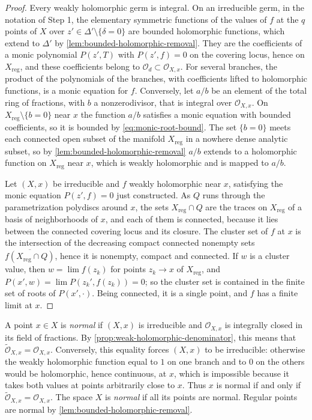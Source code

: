 \begin{proof}
Every weakly holomorphic germ is integral. On an irreducible germ, in the notation of Step 1, the elementary symmetric functions of the values of $f$ at the $q$ points of $X$ over $z'\in\Delta'\setminus\{\delta=0\}$ are bounded holomorphic functions, which extend to $\Delta'$ by \cref{lem:bounded-holomorphic-removal}. They are the coefficients of a monic polynomial $P(z',T)$ with $P(z',f)=0$ on the covering locus, hence on $X_{\mathrm{reg}}$, and these coefficients belong to $\mathcal O_d\subset\mathcal O_{X,x}$. For several branches, the product of the polynomials of the branches, with coefficients lifted to holomorphic functions, is a monic equation for $f$. Conversely, let $a/b$ be an element of the total ring of fractions, with $b$ a nonzerodivisor, that is integral over $\mathcal O_{X,x}$. On $X_{\mathrm{reg}}\setminus\{b=0\}$ near $x$ the function $a/b$ satisfies a monic equation with bounded coefficients, so it is bounded by \eqref{eq:monic-root-bound}. The set $\{b=0\}$ meets each connected open subset of the manifold $X_{\mathrm{reg}}$ in a nowhere dense analytic subset, so by \cref{lem:bounded-holomorphic-removal} $a/b$ extends to a holomorphic function on $X_{\mathrm{reg}}$ near $x$, which is weakly holomorphic and is mapped to $a/b$.

Let $(X,x)$ be irreducible and $f$ weakly holomorphic near $x$, satisfying the monic equation $P(z',f)=0$ just constructed. As $Q$ runs through the parametrization polydiscs around $x$, the sets $X_{\mathrm{reg}}\cap Q$ are the traces on $X_{\mathrm{reg}}$ of a basis of neighborhoods of $x$, and each of them is connected, because it lies between the connected covering locus and its closure. The cluster set of $f$ at $x$ is the intersection of the decreasing compact connected nonempty sets $\overline{f(X_{\mathrm{reg}}\cap Q)}$, hence it is nonempty, compact and connected. If $w$ is a cluster value, then $w=\lim f(z_k)$ for points $z_k\to x$ of $X_{\mathrm{reg}}$, and $P(x',w)=\lim P(z_k',f(z_k))=0$; so the cluster set is contained in the finite set of roots of $P(x',\cdot)$. Being connected, it is a single point, and $f$ has a finite limit at $x$.
\end{proof}

A point $x\in X$ is \emph{normal} if $(X,x)$ is irreducible and $\mathcal O_{X,x}$ is integrally closed in its field of fractions. By \cref{prop:weak-holomorphic-denominator}, this means that $\widetilde{\mathcal O}_{X,x}=\mathcal O_{X,x}$. Conversely, this equality forces $(X,x)$ to be irreducible: otherwise the weakly holomorphic function equal to $1$ on one branch and to $0$ on the others would be holomorphic, hence continuous, at $x$, which is impossible because it takes both values at points arbitrarily close to $x$. Thus $x$ is normal if and only if $\widetilde{\mathcal O}_{X,x}=\mathcal O_{X,x}$. The space $X$ is \emph{normal} if all its points are normal. Regular points are normal by \cref{lem:bounded-holomorphic-removal}.

